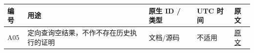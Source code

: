 \documentclass[
]{article}
\newcounter{none} %
\begin{document}
{\def\LTcaptype{none} %
\begin{longtable}[]{@{}
  >{\raggedright\arraybackslash}p{}
  >{\raggedright\arraybackslash}p{}
  >{\raggedright\arraybackslash}p{}
  >{\raggedright\arraybackslash}p{}
  >{\raggedright\arraybackslash}p{}@{}}
\toprule\noalign{}
\begin{minipage}[b]{\linewidth}\raggedright
编号
\end{minipage} & \begin{minipage}[b]{\linewidth}\raggedright
用途
\end{minipage} & \begin{minipage}[b]{\linewidth}\raggedright
原生 ID / 类型
\end{minipage} & \begin{minipage}[b]{\linewidth}\raggedright
UTC 时间
\end{minipage} & \begin{minipage}[b]{\linewidth}\raggedright
原文
\end{minipage} \\
\midrule\noalign{}
\endhead
\bottomrule\noalign{}
\endlastfoot
A05 & 定向查询空结果，不作不存在历史执行的证明 & 文档/源码 & 不适用 &
\href{/Users/oopslink/works/research/agent-harness-study/run-001/papers-010/phase1_evidence/raw/worker_control_events-selected.json}{原文} \\
\end{longtable}
}
\end{document}
